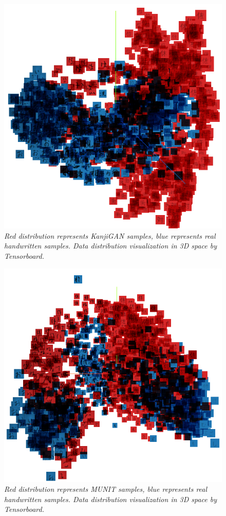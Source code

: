 \documentclass[12pt]{report}
\begin{document}
\begin{figure}[H]
	\centering
	\includegraphics[scale=1]{real-kanjigan}
	\caption{\textit{Red distribution represents KanjiGAN samples, blue represents real handwritten samples. Data distribution visualization in 3D space by Tensorboard. }}
	\label{fig:data-distribution-2}
\end{figure}

\begin{figure}[h]
	\centering
	\includegraphics[scale=1]{real-munit}
	\caption{\textit{Red distribution represents MUNIT samples, blue represents real handwritten samples. Data distribution visualization in 3D space by Tensorboard. }}
	\label{fig:data-distribution-2}
\end{figure}
\end{document}
